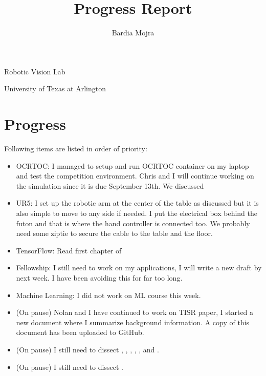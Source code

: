 \documentclass[11pt]{article}
\title{Progress Report}
\author{Bardia Mojra}
\begin{document}
	\maketitle
	\thispagestyle{empty}

\begin{center}
\bigskip
\bigskip
Robotic Vision Lab

University of Texas at Arlington
\end{center}

\newpage

\section{Progress}
Following items are listed in order of priority:
\begin{itemize}

	  \item OCRTOC: I managed to setup and run OCRTOC container on my laptop and test the competition environment. Chris and I will continue working on the simulation since it is due September 13th. We discussed

	  \item UR5: I set up the robotic arm at the center of the table as discussed but it is also simple to move to any side if needed. I put the electrical box behind the futon and that is where the hand controller is connected too. We probably need some ziptie to secure the cable to the table and the floor.

	  \item TensorFlow: Read first chapter of

	  \item Fellowship: I still need to work on my applications, I will write a new draft by next week. I have been avoiding this for far too long.

	  \item Machine Learning: I did not work on ML course this week.

  	  \item (On pause) Nolan and I have continued to work on TISR paper, I started a new document where I summarize background information. A copy of this document has been uploaded to GitHub.

  	  \item (On pause) I still need to dissect \cite{PanopticSeg2019}, \cite{SVO}, \cite{HornsMethod}, \cite{NYUV2}, \cite{DGCNNLPC}, and \cite{MaskRCNN}.

  	  \item (On pause) I still need to dissect \cite{ZinsserWilliamKnowlton2006Oww}.
\end{itemize}
\end{document}
